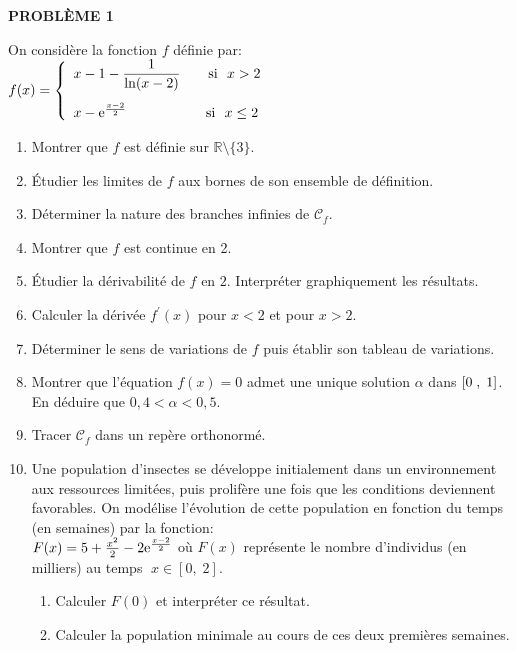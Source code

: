 



 
	
\textbf{PROBLÈME 1} 



On considère la fonction $ f $ définie   par:\\    $f(x)=\left \{\begin{array}{l} x-1-\dfrac{1}{\ln(x-2)}~~~~~~ \textrm{si}~~ x> 2  \\[0,5cm] x-\mathrm{e}^{\frac{x-2}{2}}\hspace{2cm}\textrm{si}~~ x\leq 2 ~\end{array}\right.$

 \begin{enumerate}
\item Montrer que   $ f $ est définie sur $ \mathbb{R}\setminus\{3\} $.
\item Étudier les limites de $ f $ aux bornes de son ensemble de définition.
\item Déterminer la nature des branches infinies de  $\mathscr{C}_{f}$.
\item  Montrer que $ f $ est continue en 2.
\item Étudier la   dérivabilité de $ f $  en $ 2 $. Interpréter graphiquement les résultats.
\item Calculer la dérivée $ f^{\prime} (x)$ pour $x<2$  et pour $ x> 2$.
\item Déterminer le sens de variations de $ f $ puis établir  son tableau de  variations. 
\item Montrer que l'équation  $ f(x)=0 $  admet une unique solution $ \alpha $ dans $ \left[0\;,\; 1\right] $. En déduire que $ 0,4< \alpha<0,5 $.
\item Tracer $\mathscr{C}_{f}$   dans un  repère orthonormé.
\item Une population d'insectes se développe initialement dans un environnement aux ressources limitées, puis prolifère une fois que les conditions deviennent favorables. On modélise l'évolution de cette population en fonction du temps (en semaines) par la fonction:\\ $ F(x)= 5+\frac{x^{2}}{2}-2\mathrm{e}^{\frac{x-2}{2}} $  
où \( F(x) \) représente le nombre d'individus (en milliers) au temps $\; x\in[0,\; 2]$.

\begin{enumerate}
        \item Calculer \( F(0) \) et interpréter ce résultat.       
        \item Calculer la population minimale au cours de  ces deux premières semaines.
  

\end{enumerate}
\end{enumerate}
